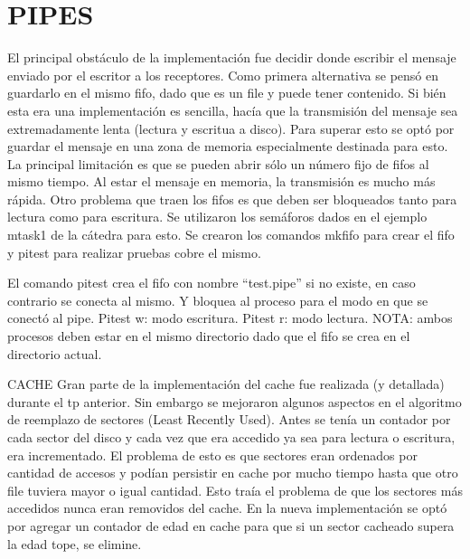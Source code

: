 \documentclass[english]{article}
\begin{document}
\maketitle
\newpage

\setcounter{page}{1} %
\tableofcontents
\newpage


\section{PIPES}

El principal obstáculo de la implementación fue decidir donde escribir
el mensaje enviado por el escritor a los receptores. Como primera
alternativa se pensó en guardarlo en el mismo fifo, dado que es un
file y puede tener contenido. Si bién esta era una implementación
es sencilla, hacía que la transmisión del mensaje sea extremadamente
lenta (lectura y escritua a disco). Para superar esto se optó por
guardar el mensaje en una zona de memoria especialmente destinada
para esto. La principal limitación es que se pueden abrir sólo un
número fijo de fifos al mismo tiempo. Al estar el mensaje en memoria,
la transmisión es mucho más rápida. Otro problema que traen los fifos
es que deben ser bloqueados tanto para lectura como para escritura.
Se utilizaron los semáforos dados en el ejemplo mtask1 de la cátedra
para esto. Se crearon los comandos mkfifo para crear el fifo y pitest
para realizar pruebas cobre el mismo.

El comando pitest crea el fifo con nombre \textquotedblleft{}test.pipe\textquotedblright{}
si no existe, en caso contrario se conecta al mismo. Y bloquea al
proceso para el modo en que se conectó al pipe. Pitest w: modo escritura.
Pitest r: modo lectura. NOTA: ambos procesos deben estar en el mismo
directorio dado que el fifo se crea en el directorio actual.

CACHE Gran parte de la implementación del cache fue realizada (y detallada)
durante el tp anterior. Sin embargo se mejoraron algunos aspectos
en el algoritmo de reemplazo de sectores (Least Recently Used). Antes
se tenía un contador por cada sector del disco y cada vez que era
accedido ya sea para lectura o escritura, era incrementado. El problema
de esto es que sectores eran ordenados por cantidad de accesos y podían
persistir en cache por mucho tiempo hasta que otro file tuviera mayor
o igual cantidad. Esto traía el problema de que los sectores más accedidos
nunca eran removidos del cache. En la nueva implementación se optó
por agregar un contador de edad en cache para que si un sector cacheado
supera la edad tope, se elimine.
\end{document}
